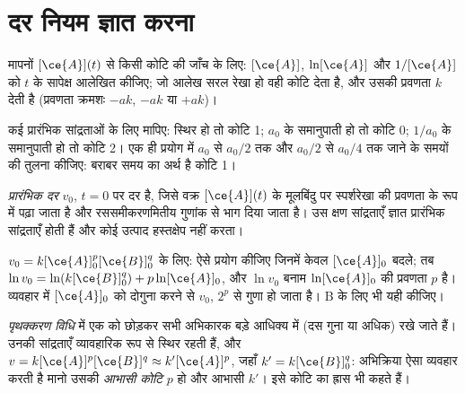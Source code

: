 \section{दर नियम ज्ञात करना}

\begin{method}[समाकल विधि]\label{met:b1:rate-laws:integral}
मापनों $[\ce{A}](t)$ से किसी कोटि की जाँच के लिए: $[\ce{A}]$,
$\ln[\ce{A}]$ और $1/[\ce{A}]$ को $t$ के सापेक्ष आलेखित कीजिए; जो आलेख सरल
रेखा हो वही कोटि देता है, और उसकी प्रवणता $k$ देती है (प्रवणता क्रमशः $-ak$, $-ak$ या $+ak$)।
\end{method}

\begin{method}[अर्ध-आयु विधि]\label{met:b1:rate-laws:half-life}
कई प्रारंभिक सांद्रताओं के लिए  मापिए: स्थिर हो तो
कोटि 1; $a_0$ के समानुपाती हो तो कोटि 0; $1/a_0$ के समानुपाती हो तो कोटि
2। एक ही प्रयोग में $a_0$ से $a_0/2$ तक
और $a_0/2$ से $a_0/4$ तक जाने के समयों की तुलना कीजिए: बराबर समय का अर्थ है कोटि 1।
\end{method}

\begin{definition}[प्रारंभिक दर]\label{def:b1:rate-laws:initial-rate}
\emph{प्रारंभिक दर} $v_0$, $t = 0$ पर दर है,
जिसे वक्र $[\ce{A}](t)$ के मूलबिंदु पर स्पर्शरेखा की प्रवणता के रूप में पढ़ा जाता है
और रससमीकरणमितीय गुणांक से भाग दिया जाता है। उस क्षण
सांद्रताएँ ज्ञात प्रारंभिक सांद्रताएँ होती हैं और कोई उत्पाद हस्तक्षेप नहीं करता।
\end{definition}

\begin{method}[प्रारंभिक दरों की विधि]\label{met:b1:rate-laws:initial-rates}
$v_0 = k[\ce{A}]_0^p[\ce{B}]_0^q$ के लिए: ऐसे प्रयोग कीजिए जिनमें केवल
$[\ce{A}]_0$ बदले; तब $\ln v_0 = \ln(k[\ce{B}]_0^q) + p\ln[\ce{A}]_0$,
और $\ln v_0$ बनाम $\ln[\ce{A}]_0$ की प्रवणता $p$ है। व्यवहार में
$[\ce{A}]_0$ को दोगुना करने से $v_0$, $2^p$ से गुणा हो जाता है। B के लिए भी यही कीजिए।
\end{method}

\begin{definition}[पृथक्करण विधि, आभासी कोटि]\label{def:b1:rate-laws:apparent-order}
\emph{पृथक्करण विधि} में एक को छोड़कर
सभी अभिकारक बड़े आधिक्य में (दस गुना या अधिक) रखे जाते हैं। उनकी सांद्रताएँ
व्यावहारिक रूप से स्थिर रहती हैं, और $v = k[\ce{A}]^p[\ce{B}]^q \approx k'[\ce{A}]^p$,
जहाँ $k' = k[\ce{B}]_0^q$: अभिक्रिया ऐसा व्यवहार करती है मानो उसकी
\emph{आभासी कोटि} $p$ हो और आभासी  $k'$। इसे कोटि का ह्रास भी कहते हैं।
\end{definition}

